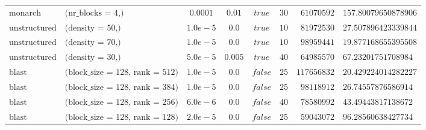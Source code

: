 \begin{table}[h!]
\begin{tabular}{llcccrrl}
$\text{monarch}$ & $\text{(nr\_blocks = 4,)}$ & $0.0001$ & $0.01$ & $true$ & $30$ & $61070592$ & $157.80079650878906$\\
$\text{unstructured}$ & $\text{(density = 50,)}$ & $1.0e-5$ & $0.0$ & $true$ & $10$ & $81972530$ & $27.507896423339844$\\
$\text{unstructured}$ & $\text{(density = 70,)}$ & $1.0e-5$ & $0.0$ & $true$ & $10$ & $98959441$ & $19.877168655395508$\\
$\text{unstructured}$ & $\text{(density = 30,)}$ & $5.0e-5$ & $0.005$ & $true$ & $40$ & $64985570$ & $67.23201751708984$\\
$\text{blast}$ & $\text{(block\_size = 128, rank = 512)}$ & $1.0e-5$ & $0.0$ & $false$ & $25$ & $117656832$ & $20.429224014282227$\\
$\text{blast}$ & $\text{(block\_size = 128, rank = 384)}$ & $1.0e-5$ & $0.0$ & $false$ & $25$ & $98118912$ & $26.74557876586914$\\
$\text{blast}$ & $\text{(block\_size = 128, rank = 256)}$ & $6.0e-6$ & $0.0$ & $false$ & $40$ & $78580992$ & $43.49443817138672$\\
$\text{blast}$ & $\text{(block\_size = 128, rank = 128)}$ & $2.0e-5$ & $0.0$ & $false$ & $25$ & $59043072$ & $96.28560638427734$\\
\end{tabular}

\end{table}
